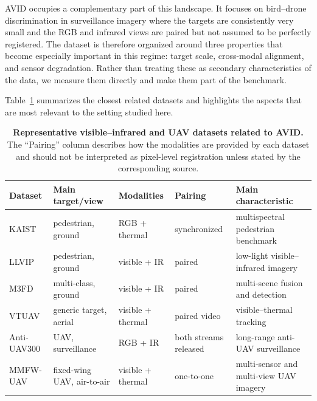 \documentclass[10pt]{article}
\newcommand{\dataset}{\textsc{AVID}}
\begin{document}
\dataset{} occupies a complementary part of this landscape. It focuses on bird--drone discrimination in surveillance imagery where the targets are consistently very small and the RGB and infrared views are paired but not assumed to be perfectly registered. The dataset is therefore organized around three properties that become especially important in this regime: target scale, cross-modal alignment, and sensor degradation. Rather than treating these as secondary characteristics of the data, we measure them directly and make them part of the benchmark.

Table~\ref{tab:related} summarizes the closest related datasets and highlights the aspects that are most relevant to the setting studied here.

\begin{table}[t]
\centering
\caption{\textbf{Representative visible--infrared and UAV datasets related to \dataset{}.}
The ``Pairing'' column describes how the modalities are provided by each dataset and should not be interpreted as pixel-level registration unless stated by the corresponding source.}
\label{tab:related}
\small
\begin{threeparttable}
\begin{tabularx}{\linewidth}{@{}l l l l X@{}}
\toprule
Dataset & Main target/view & Modalities & Pairing & Main characteristic \\
\midrule
KAIST \citep{hwang2015kaist}
& pedestrian, ground
& RGB + thermal
& synchronized
& multispectral pedestrian benchmark \\

LLVIP \citep{jia2021llvip}
& pedestrian, ground
& visible + IR
& paired
& low-light visible--infrared imagery \\

M3FD \citep{liu2022tardal}
& multi-class, ground
& visible + IR
& paired
& multi-scene fusion and detection \\

VTUAV \citep{zhang2022vtuav}
& generic target, aerial
& visible + thermal
& paired video
& visible--thermal tracking \\

Anti-UAV300 \citep{antiuavrepo}
& UAV, surveillance
& RGB + IR
& both streams released
& long-range anti-UAV surveillance \\

MMFW-UAV \citep{liu2025mmfwuav}
& fixed-wing UAV, air-to-air
& visible + thermal
& one-to-one
& multi-sensor and multi-view UAV imagery \\


\end{tabularx}
\end{threeparttable}
\end{table}
\end{document}
